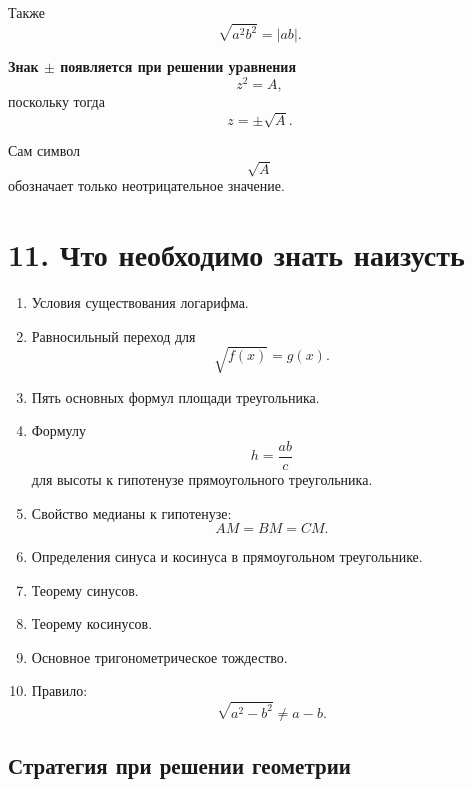 \documentclass[a4paper,12pt]{article}
\newcommand{\key}[1]{\textcolor{darkaccent}{\textbf{#1}}}
\begin{document}
Также
\[
\sqrt{a^2b^2}=|ab|.
\]

\key{Знак \(\pm\) появляется при решении уравнения}
\[
z^2=A,
\]
поскольку тогда
\[
z=\pm\sqrt A.
\]

Сам символ
\[
\sqrt A
\]
обозначает только неотрицательное значение.


\section*{\textcolor{darkaccent}{11. Что необходимо знать наизусть}}

\begin{enumerate}
    \item Условия существования логарифма.
    \item Равносильный переход для
    \[
    \sqrt{f(x)}=g(x).
    \]
    \item Пять основных формул площади треугольника.
    \item Формулу
    \[
    h=\frac{ab}{c}
    \]
    для высоты к гипотенузе прямоугольного треугольника.
    \item Свойство медианы к гипотенузе:
    \[
    AM=BM=CM.
    \]
    \item Определения синуса и косинуса в прямоугольном треугольнике.
    \item Теорему синусов.
    \item Теорему косинусов.
    \item Основное тригонометрическое тождество.
    \item Правило:
    \[
    \sqrt{a^2-b^2}\ne a-b.
    \]
\end{enumerate}

\subsection*{Стратегия при решении геометрии}
\end{document}
